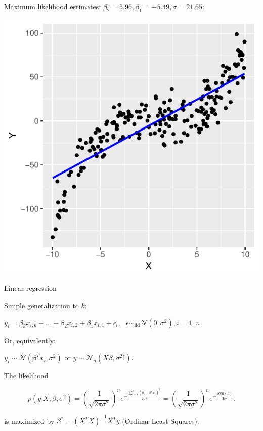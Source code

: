 \begin{frame}
\begin{analysis}

\smallskip

Maximum likelihood estimates: $\beta_2 = 5.96, \beta_1 = -5.49, \sigma = 21.65$:

\bigskip
\begin{center}
\includegraphics[width=0.40\linewidth]{../LectureAssets/L04/SimpleReg03}
\end{center}

\smallskip

\smallskip
\end{analysis}
\end{frame}


\begin{frame}{Linear regression}

Simple generalization to $k$:

\bigskip

$ y_i = \beta_k x_{i,k} + ... + \beta_2 x_{i,2} + \beta_1 x_{i,1} + \epsilon_i, \text{   }$\hfill$\epsilon \sim_\text{iid} \mathcal{N}(0, \sigma^2), i = 1..n$.

\bigskip

Or, equivalently:

\bigskip

$y_i \sim \mathcal{N}(   \beta^T  x_i, \sigma^2)$ or $ y \sim \mathcal{N}_n( X \beta , \sigma^2\mathbb{I})$.

\bigskip

The likelihood
\begin{scriptsize}
$$p( y |  X,  \beta, \sigma^2)  = \left(\frac{1}{\sqrt{2\pi\sigma^2}}\right)^n e^{-\frac{\sum_{i=1}^n (y_i -  \beta^T  x_{i})^2}{2\sigma^2}}  = \left(\frac{1}{\sqrt{2\pi\sigma^2}}\right)^n e^{-\frac{SSR( \beta)}{2\sigma^2}}.$$
\end{scriptsize}

is maximized by $ \beta^* = ( X^T  X)^{-1}  X^T  y $ (Ordinar Least Squares).

\end{frame}


